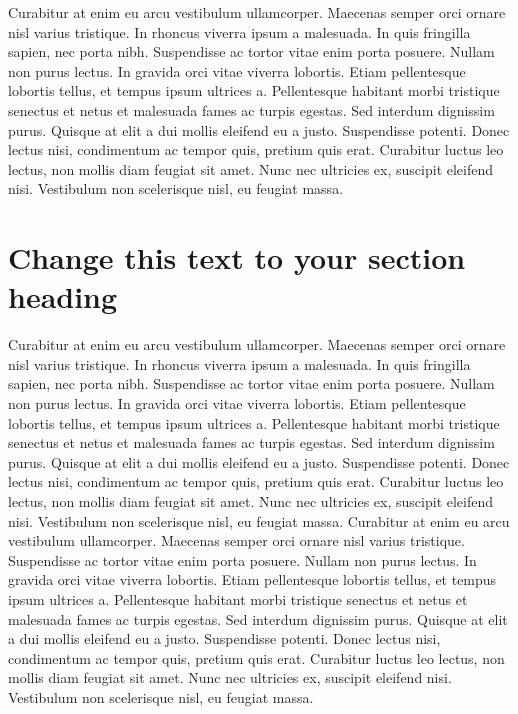 \documentclass[11pt]{report}
\begin{document}
Curabitur at enim eu arcu vestibulum ullamcorper. Maecenas semper orci ornare nisl varius tristique. In rhoncus viverra ipsum a malesuada. In quis fringilla sapien, nec porta nibh. Suspendisse ac tortor vitae enim porta posuere. Nullam non purus lectus. In gravida orci vitae viverra lobortis. Etiam pellentesque lobortis tellus, et tempus ipsum ultrices a. Pellentesque habitant morbi tristique senectus et netus et malesuada fames ac turpis egestas. Sed interdum dignissim purus. Quisque at elit a dui mollis eleifend eu a justo. Suspendisse potenti. Donec lectus nisi, condimentum ac tempor quis, pretium quis erat. Curabitur luctus leo lectus, non mollis diam feugiat sit amet. Nunc nec ultricies ex, suscipit eleifend nisi. Vestibulum non scelerisque nisl, eu feugiat massa. 

\section*{Change this text to your section heading}
Curabitur at enim eu arcu vestibulum ullamcorper. Maecenas semper orci ornare nisl varius tristique. In rhoncus viverra ipsum a malesuada. In quis fringilla sapien, nec porta nibh. Suspendisse ac tortor vitae enim porta posuere. Nullam non purus lectus. In gravida orci vitae viverra lobortis. Etiam pellentesque lobortis tellus, et tempus ipsum ultrices a. Pellentesque habitant morbi tristique senectus et netus et malesuada fames ac turpis egestas. Sed interdum dignissim purus. Quisque at elit a dui mollis eleifend eu a justo. Suspendisse potenti. Donec lectus nisi, condimentum ac tempor quis, pretium quis erat. Curabitur luctus leo lectus, non mollis diam feugiat sit amet. Nunc nec ultricies ex, suscipit eleifend nisi. Vestibulum non scelerisque nisl, eu feugiat massa. Curabitur at enim eu arcu vestibulum ullamcorper. Maecenas semper orci ornare nisl varius tristique. Suspendisse ac tortor vitae enim porta posuere. Nullam non purus lectus. In gravida orci vitae viverra lobortis. Etiam pellentesque lobortis tellus, et tempus ipsum ultrices a. Pellentesque habitant morbi tristique senectus et netus et malesuada fames ac turpis egestas. Sed interdum dignissim purus. Quisque at elit a dui mollis eleifend eu a justo. Suspendisse potenti. Donec lectus nisi, condimentum ac tempor quis, pretium quis erat. Curabitur luctus leo lectus, non mollis diam feugiat sit amet. Nunc nec ultricies ex, suscipit eleifend nisi. Vestibulum non scelerisque nisl, eu feugiat massa.  
\end{document}
